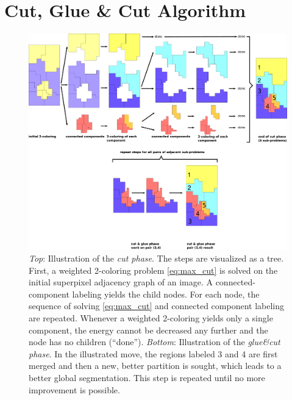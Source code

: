 
\section{Cut, Glue \& Cut Algorithm\label{sec:cut_glue_cut_algorithm}}







\begin{figure}
\centering\includegraphics[width=\textwidth]{fig/illustration_new.pdf}
\caption{\label{fig:illustration_cut}%
%
\emph{Top}:
Illustration of the \emph{cut phase}.
The steps are visualized as a
tree.
First, a weighted 2-coloring problem \eqref{eq:max_cut}
is solved on the initial
superpixel adjacency graph of an image. A connected-component labeling
yields the child nodes. For each node, the sequence of solving \eqref{eq:max_cut} 
and connected component labeling are repeated. Whenever a weighted 2-coloring
yields only a single component, the energy cannot be decreased any further and the
node has no children (``done'').
%
\emph{Bottom}:
Illustration of the \emph{glue\&cut phase}. In the illustrated move,
the regions labeled 3 and 4 are first merged and then a new, better 
partition is sought, which leads to a better global segmentation. This step
is repeated until no more improvement is possible.
}
\end{figure}





